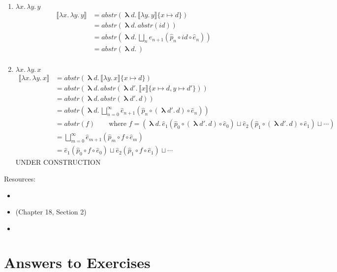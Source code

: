 \documentclass{tufte-handout}
\newcommand{\SEM}[1]{\llbracket #1 \rrbracket}
\newcommand{\LAM}[1]{\lambda #1.\,}
\newcommand{\MLAM}[1]{\boldsymbol\uplambda #1.\,}
\begin{document}
\begin{Answer}
\begin{enumerate}
  \item $\LAM{x}\LAM{y}y$
    \begin{align*}
      \SEM{\LAM{x}\LAM{y}y} &=
      \mathit{abstr}(\MLAM{d}\SEM{\LAM{y}y}\{x\mapsto d\}) \\
      &= \mathit{abstr}(\MLAM{d} \mathit{abstr}(\mathit{id})) \\
      &= \mathit{abstr}(\MLAM{d} \bigsqcup_n \hat{e}_{n+1}(\hat{p}_n\circ \mathit{id} \circ \hat{e}_n)) \\
      &= \mathit{abstr}(\MLAM{d} ) \\
    \end{align*}

  \item $\LAM{x}\LAM{y}x$
    \begin{align*}
      \SEM{\LAM{x}\LAM{y}x} &= \mathit{abstr}(\MLAM{d} \SEM{\LAM{y}x}\{x\mapsto d\}) \\
      &= \mathit{abstr}(\MLAM{d} \mathit{abstr}(\MLAM{d'}\SEM{x}\{x\mapsto d,y\mapsto d'\})) \\
      &= \mathit{abstr}(\MLAM{d} \mathit{abstr}(\MLAM{d'}d)) \\
      &= \mathit{abstr}(\MLAM{d} \bigsqcup_{n=0}^\infty \hat{e}_{n+1}(\hat{p}_n \circ (\MLAM{d'}d) \circ \hat{e}_n)) \\
      &= \mathit{abstr}(f)  \qquad \text{where }
f = (\MLAM{d} \hat{e}_{1}(\hat{p}_0 \circ (\MLAM{d'}d) \circ \hat{e}_0)  \sqcup \hat{e}_{2}(\hat{p}_1 \circ (\MLAM{d'}d) \circ \hat{e}_1) \sqcup \cdots )\\
      &= \bigsqcup_{m=0}^\infty \hat{e}_{m+1}(\hat{p}_m \circ f \circ \hat{e}_m)\\
      &= \hat{e}_{1}(\hat{p}_0 \circ f \circ \hat{e}_0)
        \sqcup \hat{e}_{2}(\hat{p}_1 \circ f \circ \hat{e}_1)
        \sqcup \cdots
    \end{align*}
    UNDER CONSTRUCTION
    

  \end{enumerate}
\end{Answer}

Resources:
\begin{itemize}
\item \citet{Scott:1971aa}
\item \citet{barendregt84:_lambda_calculus} (Chapter 18, Section 2)
\item \citet{Amadio:1998fk}
\end{itemize}

\clearpage
\pagebreak

\section*{Answers to Exercises}

\shipoutAnswer

\clearpage
\pagebreak



\end{document}
